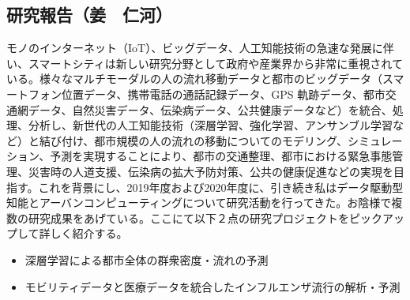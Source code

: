 \subsection{研究報告（姜　仁河）}

モノのインターネット（IoT）、ビッグデータ、人工知能技術の急速な発展に伴い、スマートシティは新しい研究分野として政府や産業界から非常に重視されている。様々なマルチモーダルの人の流れ移動データと都市のビッグデータ（スマートフォン位置データ、携帯電話の通話記録データ、GPS 軌跡データ、都市交通網データ、自然災害データ、伝染病データ、公共健康データなど）を統合、処理、分析し、新世代の人工知能技術（深層学習、強化学習、アンサンブル学習など）と結び付け、都市規模の人の流れの移動についてのモデリング、シミュレーション、予測を実現することにより、都市の交通整理、都市における緊急事態管理、災害時の人道支援、伝染病の拡大予防対策、公共の健康促進などの実現を目指す。これを背景にし、2019年度および2020年度に、引き続き私はデータ駆動型知能とアーバンコンピューティングについて研究活動を行ってきた。お陰様で複数の研究成果\cite{JIANG1901,JIANG2001,JIANG2002,JIANG2003,JIANG1902,JIANG1903,JIANG1904,JIANG2004,JIANG2005,JIANG2006}をあげている。ここにて以下２点の研究プロジェクトをピックアップして詳しく紹介する。

\begin{itemize}
    \item 深層学習による都市全体の群衆密度・流れの予測
    \item モビリティデータと医療データを統合したインフルエンザ流行の解析・予測
\end{itemize}

